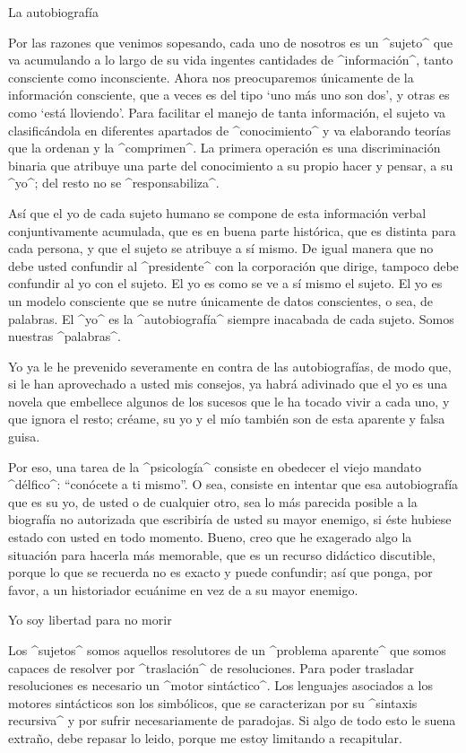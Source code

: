 

\Section La autobiografía

Por las razones que venimos sopesando, cada uno de nosotros es un
^sujeto^ que va acumulando a lo largo de su vida ingentes cantidades de
^información^, tanto consciente como inconsciente. Ahora nos
preocuparemos únicamente de la información consciente, que a veces es
del tipo `uno más uno son dos', y otras es como `está lloviendo'. Para
facilitar el manejo de tanta información, el sujeto va clasificándola en
diferentes apartados de ^conocimiento^ y va elaborando teorías que la
ordenan y la ^comprimen^. La primera operación es una discriminación
binaria que atribuye una parte del conocimiento a su propio hacer y
pensar, a su ^yo^; del resto no se ^responsabiliza^.

Así que el yo de cada sujeto humano se compone de esta información
verbal conjuntivamente acumulada, que es en buena parte histórica, que
es distinta para cada persona, y que el sujeto se atribuye a sí mismo.
De igual manera que no debe usted confundir al ^presidente^ con la
corporación que dirige, tampoco debe confundir al yo con el sujeto. El
yo es como se ve a sí mismo el sujeto. El yo es un modelo consciente que
se nutre únicamente de datos conscientes, o sea, de palabras. El ^yo^ es
la ^autobiografía^ siempre inacabada de cada sujeto. Somos nuestras
^palabras^.

Yo ya le he prevenido severamente en contra de las autobiografías, de
modo que, si le han aprovechado a usted mis consejos, ya habrá adivinado
que el yo es una novela que embellece algunos de los sucesos que le ha
tocado vivir a cada uno, y que ignora el resto; créame, su yo y el mío
también son de esta aparente y falsa guisa.

Por eso, una tarea de la ^psicología^ consiste en obedecer el viejo
mandato ^délfico^: ``conócete a ti mismo''. O sea, consiste en intentar
que esa autobiografía que es su yo, de usted o de cualquier otro, sea lo
más parecida posible a la biografía no autorizada que escribiría de
usted su mayor enemigo, si éste hubiese estado con usted en todo
momento. Bueno, creo que he exagerado algo la situación para hacerla más
memorable, que es un recurso didáctico discutible, porque lo que se
recuerda no es exacto y puede confundir; así que ponga, por favor, a un
historiador ecuánime en vez de a su mayor enemigo.


\Section Yo soy libertad para no morir

Los ^sujetos^ somos aquellos resolutores de un ^problema aparente^ que
somos capaces de resolver por ^traslación^ de resoluciones. Para poder
trasladar resoluciones es necesario un ^motor sintáctico^. Los lenguajes
asociados a los motores sintácticos son los simbólicos, que se
caracterizan por su ^sintaxis recursiva^ y por sufrir necesariamente de
paradojas. Si algo de todo esto le suena extraño, debe repasar lo leido,
porque me estoy limitando a recapitular.

